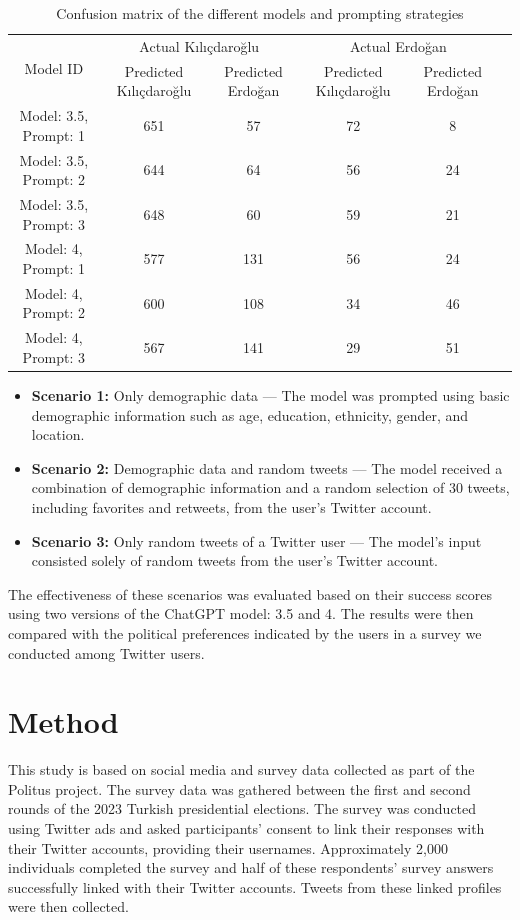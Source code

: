 \documentclass[sigconf,natbib=false]{acmart}
\begin{document}
\begin{table}
  \caption{Confusion matrix of the different models and prompting strategies}
  \label{tab:confusion}
  \begin{tabular}{cccccc}
    \toprule
    \multirow{2}{*}{Model ID} & \multicolumn{2}{c}{Actual Kılıçdaroğlu} & \multicolumn{2}{c}{Actual Erdoğan} \\
    \cmidrule(lr){2-3} \cmidrule(lr){4-5}
     & Predicted Kılıçdaroğlu & Predicted Erdoğan & Predicted Kılıçdaroğlu & Predicted Erdoğan \\
    \midrule
    Model: 3.5, Prompt: 1 & 651 & 57 & 72 & 8 \\
    Model: 3.5, Prompt: 2 & 644 & 64 & 56 & 24 \\
    Model: 3.5, Prompt: 3 & 648 & 60 & 59 & 21 \\
    Model: 4, Prompt: 1 & 577 & 131 & 56 & 24 \\
    Model: 4, Prompt: 2 & 600 & 108 & 34 & 46 \\
    Model: 4, Prompt: 3 & 567 & 141 & 29 & 51 \\
    \bottomrule
  \end{tabular}
\end{table}


\begin{itemize}
    \item \textbf{Scenario 1:} Only demographic data — The model was prompted using basic demographic information such as age, education, ethnicity, gender, and location.
    \item \textbf{Scenario 2:} Demographic data and random tweets — The model received a combination of demographic information and a random selection of 30 tweets, including favorites and retweets, from the user's Twitter account.
    \item \textbf{Scenario 3:} Only random tweets of a Twitter user — The model's input consisted solely of random tweets from the user's Twitter account.
\end{itemize}

The effectiveness of these scenarios was evaluated based on their success scores using two versions of the ChatGPT model: 3.5 and 4. The results were then compared with the political preferences indicated by the users in a survey we conducted among Twitter users.

\section{Method}
This study is based on social media and survey data collected as part of the Politus project. The survey data was gathered between the first and second rounds of the 2023 Turkish presidential elections. The survey was conducted using Twitter ads and asked participants’ consent to link their responses with their Twitter accounts, providing their usernames. Approximately 2,000 individuals completed the survey and half of these respondents’ survey answers successfully linked with their Twitter accounts. Tweets from these linked profiles were then collected.
\end{document}
